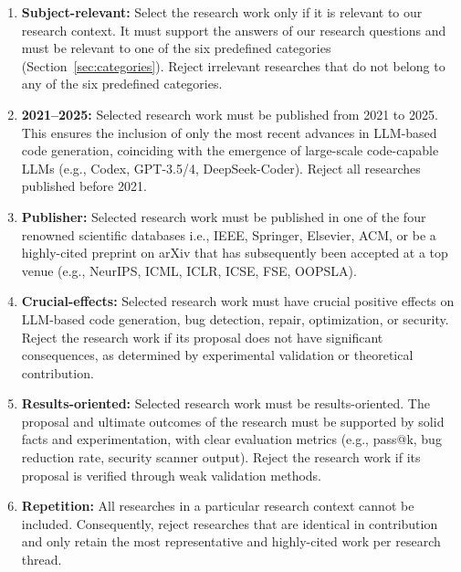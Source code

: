 \documentclass[11pt,a4paper]{article}
\begin{document}
\begin{enumerate}[leftmargin=*]
\item \textbf{Subject-relevant:} Select the research work only if it is relevant to our research context. It must support the answers of our research questions and must be relevant to one of the six predefined categories (Section~\ref{sec:categories}). Reject irrelevant researches that do not belong to any of the six predefined categories.

\item \textbf{2021--2025:} Selected research work must be published from 2021 to 2025. This ensures the inclusion of only the most recent advances in LLM-based code generation, coinciding with the emergence of large-scale code-capable LLMs (e.g., Codex, GPT-3.5/4, DeepSeek-Coder). Reject all researches published before 2021.

\item \textbf{Publisher:} Selected research work must be published in one of the four renowned scientific databases i.e., IEEE, Springer, Elsevier, ACM, or be a highly-cited preprint on arXiv that has subsequently been accepted at a top venue (e.g., NeurIPS, ICML, ICLR, ICSE, FSE, OOPSLA).

\item \textbf{Crucial-effects:} Selected research work must have crucial positive effects on LLM-based code generation, bug detection, repair, optimization, or security. Reject the research work if its proposal does not have significant consequences, as determined by experimental validation or theoretical contribution.

\item \textbf{Results-oriented:} Selected research work must be results-oriented. The proposal and ultimate outcomes of the research must be supported by solid facts and experimentation, with clear evaluation metrics (e.g., pass@k, bug reduction rate, security scanner output). Reject the research work if its proposal is verified through weak validation methods.

\item \textbf{Repetition:} All researches in a particular research context cannot be included. Consequently, reject researches that are identical in contribution and only retain the most representative and highly-cited work per research thread.
\end{enumerate}

\end{document}
